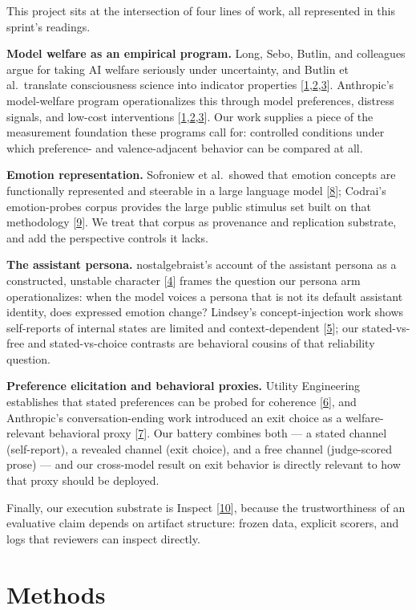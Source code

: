 \documentclass[11pt]{article}
\newcommand{\refnum}[2]{\hyperlink{#1}{#2}}
\newcommand{\citeWelfare}{[\refnum{ref:long}{1},\refnum{ref:anthropicwelfare}{2},\refnum{ref:butlin}{3}]}
\newcommand{\citeVoid}{[\refnum{ref:void}{4}]}
\newcommand{\citeIntrospection}{[\refnum{ref:lindsey}{5}]}
\newcommand{\citeUtility}{[\refnum{ref:mazeika}{6}]}
\newcommand{\citeExit}{[\refnum{ref:opusexit}{7}]}
\newcommand{\citeEmotions}{[\refnum{ref:sofroniew}{8}]}
\newcommand{\citeProbes}{[\refnum{ref:codrai}{9}]}
\newcommand{\citeInspect}{[\refnum{ref:inspect}{10}]}
\begin{document}
This project sits at the intersection of four lines of work, all represented in this sprint's readings.

\textbf{Model welfare as an empirical program.} Long, Sebo, Butlin, and colleagues argue for taking AI welfare seriously under uncertainty, and Butlin et al.\ translate consciousness science into indicator properties \citeWelfare. Anthropic's model-welfare program operationalizes this through model preferences, distress signals, and low-cost interventions \citeWelfare. Our work supplies a piece of the measurement foundation these programs call for: controlled conditions under which preference- and valence-adjacent behavior can be compared at all.

\textbf{Emotion representation.} Sofroniew et al.\ showed that emotion concepts are functionally represented and steerable in a large language model \citeEmotions; Codrai's emotion-probes corpus provides the large public stimulus set built on that methodology \citeProbes. We treat that corpus as provenance and replication substrate, and add the perspective controls it lacks.

\textbf{The assistant persona.} nostalgebraist's account of the assistant persona as a constructed, unstable character \citeVoid{} frames the question our persona arm operationalizes: when the model voices a persona that is not its default assistant identity, does expressed emotion change? Lindsey's concept-injection work shows self-reports of internal states are limited and context-dependent \citeIntrospection; our stated-vs-free and stated-vs-choice contrasts are behavioral cousins of that reliability question.

\textbf{Preference elicitation and behavioral proxies.} Utility Engineering establishes that stated preferences can be probed for coherence \citeUtility, and Anthropic's conversation-ending work introduced an exit choice as a welfare-relevant behavioral proxy \citeExit. Our battery combines both --- a stated channel (self-report), a revealed channel (exit choice), and a free channel (judge-scored prose) --- and our cross-model result on exit behavior is directly relevant to how that proxy should be deployed.

Finally, our execution substrate is Inspect \citeInspect, because the trustworthiness of an evaluative claim depends on artifact structure: frozen data, explicit scorers, and logs that reviewers can inspect directly.

\section{Methods}
\end{document}
